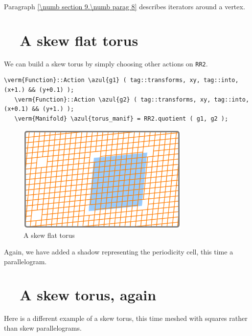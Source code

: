 Paragraph \ref{\numb section 9.\numb parag 8} describes iterators around a vertex.


\section{~~A skew flat torus}\label{\numb section 7.\numb parag 7}

We can build a skew torus by simply choosing other actions on {\small\tt RR2}.

\begin{Verbatim}[commandchars=\\\{\},formatcom=\small\tt,frame=single,
   label=parag-\ref{\numb section 7.\numb parag 7}.cpp,rulecolor=\color{coment},
   baselinestretch=0.94,framesep=2mm                                            ]
   \verm{Function}::Action \azul{g1} ( tag::transforms, xy, tag::into, (x+1.) && (y+0.1) );
   \verm{Function}::Action \azul{g2} ( tag::transforms, xy, tag::into, (x+0.1) && (y+1.) );
   \verm{Manifold} \azul{torus_manif} = RR2.quotient ( g1, g2 );
\end{Verbatim}

\begin{figure}[ht] \centering
  \includegraphics[width=85mm]{flat-torus-3.eps}
  \caption{A skew flat torus}
  \label{\numb section 7.\numb fig 3}
\end{figure}

Again, we have added a shadow representing the periodicity cell, this time a parallelogram.


\section{~~A skew torus, again}\label{\numb section 7.\numb parag 8}

Here is a different example of a skew torus, this time meshed with squares
rather than skew parallelograms.

